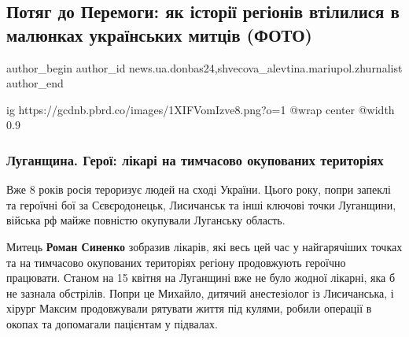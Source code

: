  
 
 
 
 
 
\subsection{Потяг до Перемоги: як історії регіонів втілилися в малюнках українських митців (ФОТО)}
\label{sec:11_09_2022.stz.news.ua.donbas24.1.potjag_do_peremogy}
 
\ifcmt
 author_begin
   author_id news.ua.donbas24,shvecova_alevtina.mariupol.zhurnalist
 author_end
\fi

\ifcmt
  ig https://gcdnb.pbrd.co/images/1XIFVomIzve8.png?o=1
  @wrap center
  @width 0.9
\fi


\subsubsection{Луганщина. Герої: лікарі на тимчасово окупованих територіях}

Вже 8 років росія тероризує людей на сході України. Цього року, попри запеклі
та героїчні бої за Сєвєродонецьк, Лисичанськ та інші ключові точки Луганщини,
війська рф майже повністю окупували Луганську область.

Митець \textbf{Роман Синенко} зобразив лікарів, які весь цей час у найгарячіших точках
та на тимчасово окупованих територіях регіону продовжують героїчно працювати.
Станом на 15 квітня на Луганщині вже не було жодної лікарні, яка б не зазнала
обстрілів. Попри це Михайло, дитячий анестезіолог із Лисичанська, і хірург
Максим продовжували рятувати життя під кулями, робили операції в окопах та
допомагали пацієнтам у підвалах.

